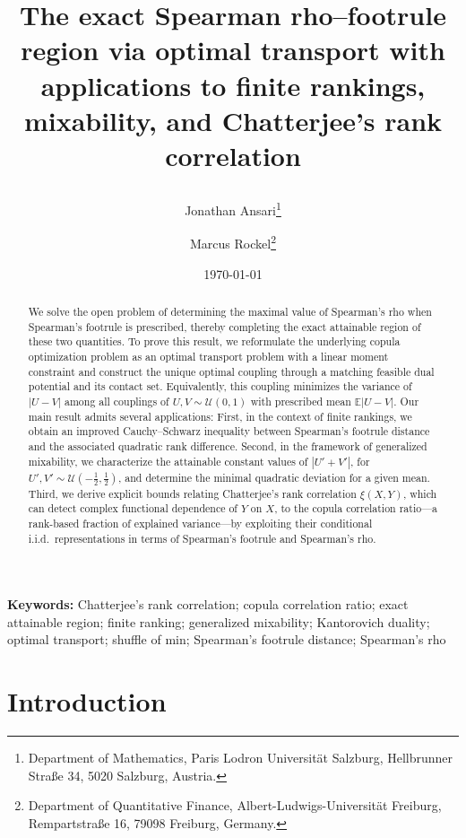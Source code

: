 \documentclass{article}
\title{
The exact Spearman rho--footrule region via optimal transport with applications to finite rankings, mixability, and Chatterjee's rank correlation

}
\author{%
	Jonathan Ansari\thanks{Department of Mathematics, Paris Lodron Universit\"at Salzburg,
	Hellbrunner Stra\ss e 34, 5020 Salzburg, Austria.}
	\and
	Marcus Rockel\thanks{Department of Quantitative Finance, Albert-Ludwigs-Universit\"at Freiburg,
	Rempartstra\ss e 16, 79098 Freiburg, Germany.}%
}
\date{\today}
\newcommand{\E}{\mathbb{E}}
\newcommand{\cU}{\mathcal{U}}
\begin{document}
\maketitle

\begin{abstract}
We solve the open problem of determining the maximal value of Spearman's rho when Spearman's footrule is prescribed, thereby completing the exact attainable region of these two quantities.
To prove this result, we reformulate the underlying copula optimization problem as an optimal transport problem with a linear moment constraint and construct the unique optimal coupling through a matching feasible dual potential and its contact set.
Equivalently, this coupling minimizes the variance of \(|U-V|\) among all couplings of \(U,V\sim \cU(0,1)\) with prescribed mean
\(\E|U-V|\).
Our main result admits several applications: 
First, in the context of finite rankings, we obtain an improved Cauchy--Schwarz inequality between Spearman's footrule distance and the associated quadratic rank difference.
Second, in the framework of generalized mixability, we characterize the
attainable constant values of \(|U'+V'|\), for \(U',V'\sim \cU(-\tfrac 1 2, \tfrac 1 2)\), and determine the minimal quadratic deviation for a given mean.
Third, we derive explicit bounds relating Chatterjee's rank correlation
\(\xi(X,Y)\), which can detect complex functional dependence of \(Y\) on \(X\), to the copula correlation ratio---a rank-based fraction of explained variance---by exploiting their conditional i.i.d.\ representations in terms of Spearman's footrule and Spearman's rho.




\end{abstract}

\medskip
\noindent\textbf{Keywords:}
Chatterjee's rank correlation; copula correlation ratio; exact attainable region; finite ranking; generalized mixability; Kantorovich duality; optimal transport; shuffle of min; Spearman's footrule distance; Spearman's rho


\section{Introduction}\label{sec:intro}
\end{document}
